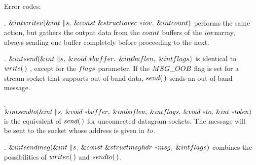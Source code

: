 \medskip
Error codes:
\medskip{}

\fi

. \CD{}$\&{int}\ \\{writev}(\&{int}\ \|s,\;\&{const}\ \&{struct}\ \\{iovec}%
\ {*}\\{iov},\;\&{int}\ \\{count})$\DC{} performs the same
action, but gathers the output data from the \CD{}$\\{count}$\DC{} buffers of
the \CD{}$\\{iov}$\DC{}narray, always
sending one buffer completely before proceeding to the next.

\fi

. \CD{}$\&{int}\ \\{send}(\&{int}\ \|s,\;\&{void}\ {*}\\{buffer},\;\&{int}\
\\{buflen},\;\&{int}\ \\{flags})$\DC{} is identical to \CD{}$\\{write}(\,)$%
\DC{},
except for the \CD{}$\\{flags}$\DC{} parameter. If the \CD{}$\\{MSG\_OOB}$\DC{}
flag is set for a stream socket
that supports out-of-band data, \CD{}$\\{send}(\,)$\DC{} sends an out-of-band
message.

\fi

. \CD{}$\&{int}\ \\{sendto}(\&{int}\ \|s,\;\&{void}\ {*}\\{buffer},\;%
\&{int}\ \\{buflen},\;\&{int}\ \\{flags},\;\&{void}\ {*}\\{to},\;\&{int}\ {*}%
\\{tolen})$\DC{}
is the equivalent of \CD{}$\\{send}(\,)$\DC{} for unconnected datagram sockets.
The message will
be sent to the socket whose address is given in \CD{}$\\{to}$\DC{}.

\fi

. \CD{}$\&{int}\ \\{sendmsg}(\&{int}\ \|s,\;\&{const}\ \&{struct}\ %
\\{msghdr}\ {*}\\{msg},\;\&{int}\ \\{flags})$\DC{} combines the possibilities
of \CD{}$\\{writev}(\,)$\DC{} and \CD{}$\\{sendto}(\,)$\DC{}.

